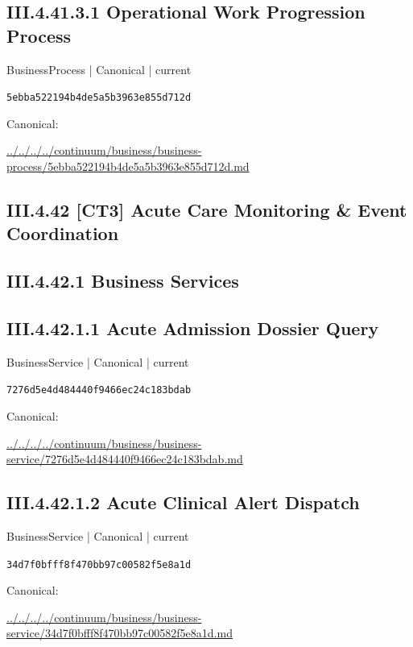 \documentclass[10pt,a4paper]{article}
\begin{document}
\subsection*{III.4.41.3.1 Operational Work Progression Process}
{\small BusinessProcess | Canonical | current}\par
\texttt{5ebba522194b4de5a5b3963e855d712d}\par
Canonical: \par
{\footnotesize\url{../../../../continuum/business/business-process/5ebba522194b4de5a5b3963e855d712d.md}}\par
\subsection*{III.4.42 [CT3] Acute Care Monitoring \& Event Coordination}
\subsection*{III.4.42.1 Business Services}
\subsection*{III.4.42.1.1 Acute Admission Dossier Query}
{\small BusinessService | Canonical | current}\par
\texttt{7276d5e4d484440f9466ec24c183bdab}\par
Canonical: \par
{\footnotesize\url{../../../../continuum/business/business-service/7276d5e4d484440f9466ec24c183bdab.md}}\par
\subsection*{III.4.42.1.2 Acute Clinical Alert Dispatch}
{\small BusinessService | Canonical | current}\par
\texttt{34d7f0bfff8f470bb97c00582f5e8a1d}\par
Canonical: \par
{\footnotesize\url{../../../../continuum/business/business-service/34d7f0bfff8f470bb97c00582f5e8a1d.md}}\par
\end{document}
